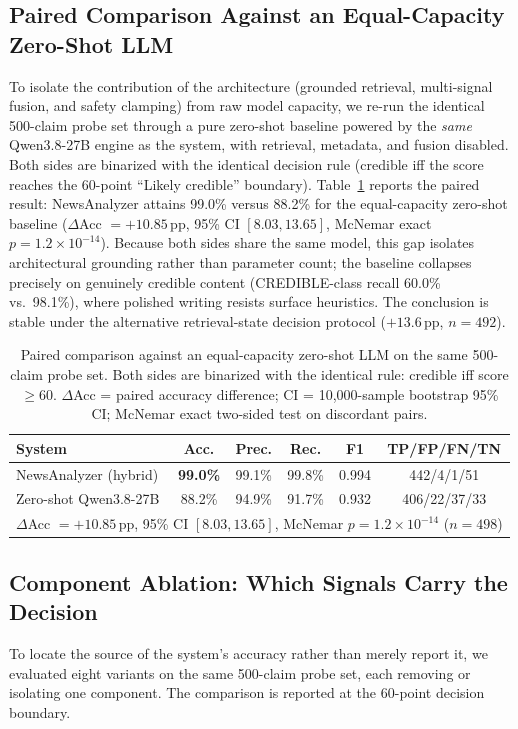 \documentclass[twoside]{llncs}
\begin{document}
\subsection{Paired Comparison Against an Equal-Capacity Zero-Shot LLM}
To isolate the contribution of the architecture (grounded retrieval, multi-signal fusion, and safety clamping) from raw model capacity, we re-run the identical 500-claim probe set through a pure zero-shot baseline powered by the \emph{same} Qwen3.8-27B engine as the system, with retrieval, metadata, and fusion disabled. Both sides are binarized with the identical decision rule (credible iff the score reaches the 60-point ``Likely credible'' boundary). Table~\ref{tab:fair} reports the paired result: NewsAnalyzer attains 99.0\% versus 88.2\% for the equal-capacity zero-shot baseline ($\Delta$Acc $= +10.85$\,pp, 95\% CI $[8.03, 13.65]$, McNemar exact $p = 1.2\times10^{-14}$). Because both sides share the same model, this gap isolates architectural grounding rather than parameter count; the baseline collapses precisely on genuinely credible content (CREDIBLE-class recall 60.0\% vs.\ 98.1\%), where polished writing resists surface heuristics. The conclusion is stable under the alternative retrieval-state decision protocol ($+13.6$\,pp, $n=492$).

\begin{table}[!htbp]
\caption{Paired comparison against an equal-capacity zero-shot LLM on the same 500-claim probe set. Both sides are binarized with the identical rule: credible iff score $\ge 60$. $\Delta$Acc = paired accuracy difference; CI = 10{,}000-sample bootstrap 95\% CI; McNemar exact two-sided test on discordant pairs.}
\label{tab:fair}
\centering
\begin{tabular}{lccccc}
\toprule
\textbf{System} & \textbf{Acc.} & \textbf{Prec.} & \textbf{Rec.} & \textbf{F1} & \textbf{TP/FP/FN/TN} \\
\midrule
NewsAnalyzer (hybrid) & \textbf{99.0\%} & 99.1\% & 99.8\% & 0.994 & 442/4/1/51 \\
Zero-shot Qwen3.8-27B & 88.2\% & 94.9\% & 91.7\% & 0.932 & 406/22/37/33 \\
\midrule
\multicolumn{6}{l}{$\Delta$Acc $= +10.85$\,pp, 95\% CI $[8.03, 13.65]$, McNemar $p = 1.2\times10^{-14}$ ($n=498$)} \\
\bottomrule
\end{tabular}
\end{table}

\subsection{Component Ablation: Which Signals Carry the Decision}
\label{sec:ablation}
To locate the source of the system's accuracy rather than merely report it, we evaluated eight variants on the same 500-claim probe set, each removing or isolating one component. The comparison is reported at the $60$-point decision boundary.
\end{document}
